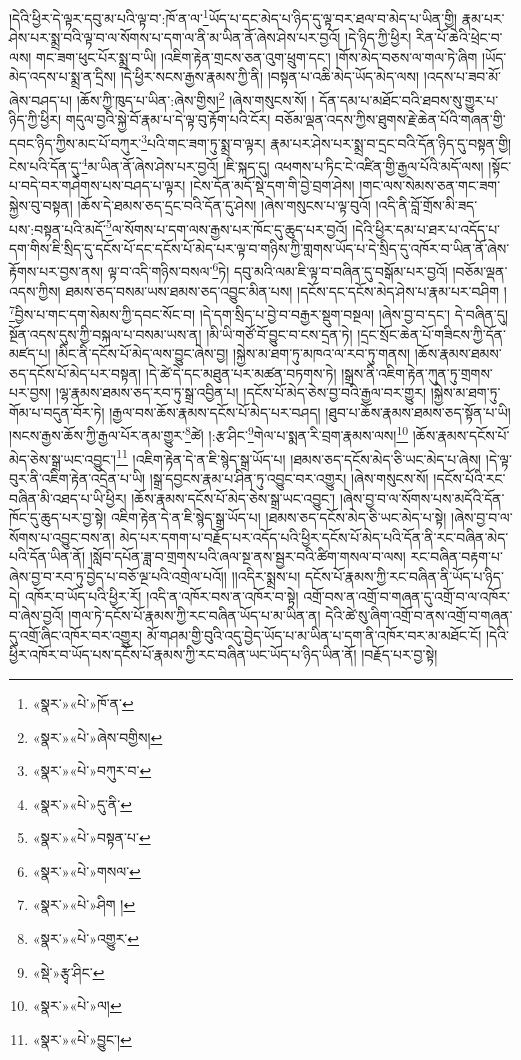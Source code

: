 །དེའི་ཕྱིར་དེ་ལྟར་དབུ་མ་པའི་ལྟ་བ་:ཁོ་ན་ལ་\footnote{«སྣར་»«པེ་»ཁོ་ན་}ཡོད་པ་དང་མེད་པ་ཉིད་དུ་ལྟ་བར་ཐལ་བ་མེད་པ་ཡིན་གྱི། རྣམ་པར་ཤེས་པར་སྨྲ་བའི་ལྟ་བ་ལ་སོགས་པ་དག་ལ་ནི་མ་ཡིན་ནོ་ཞེས་ཤེས་པར་བྱའོ། །དེ་ཉིད་ཀྱི་ཕྱིར། རིན་པོ་ཆེའི་ཕྲེང་བ་ལས། གང་ཟག་ཕུང་པོར་སྨྲ་བ་ཡི། །འཇིག་རྟེན་གྲངས་ཅན་འུག་ཕྲུག་དང་། །གོས་མེད་བཅས་ལ་གལ་ཏེ་ཞིག །ཡོད་མེད་འདས་པ་སྨྲ་ན་དྲིས། །དེ་ཕྱིར་སངས་རྒྱས་རྣམས་ཀྱི་ནི། །བསྟན་པ་འཆི་མེད་ཡོད་མེད་ལས། །འདས་པ་ཟབ་མོ་ཞེས་བཤད་པ། །ཆོས་ཀྱི་ཁུད་པ་ཡིན་:ཞེས་གྱིས།\footnote{«སྣར་»«པེ་»ཞེས་བགྱིས།} །ཞེས་གསུངས་སོ། །
དོན་དམ་པ་མཐོང་བའི་ཐབས་སུ་གྱུར་པ་ཉིད་ཀྱི་ཕྱིར། གདུལ་བྱའི་སྐྱེ་བོ་རྣམ་པ་དེ་ལྟ་བུ་རྟོག་པའི་ངོར། བཅོམ་ལྡན་འདས་ཀྱིས་ཐུགས་རྗེ་ཆེན་པོའི་གཞན་གྱི་དབང་ཉིད་ཀྱིས་མང་པོ་བཀུར་\footnote{«སྣར་»«པེ་»བཀུར་བ་}པའི་གང་ཟག་ཏུ་སྨྲ་བ་ལྟར། རྣམ་པར་ཤེས་པར་སྨྲ་བ་དྲང་བའི་དོན་ཉིད་དུ་བསྟན་གྱི། ངེས་པའི་དོན་དུ་\footnote{«སྣར་»«པེ་»དུ་ནི་}མ་ཡིན་ནོ་ཞེས་ཤེས་པར་བྱའོ། །ཇི་སྐད་དུ། འཕགས་པ་ཏིང་ངེ་འཛིན་གྱི་རྒྱལ་པོའི་མདོ་ལས། །སྟོང་པ་བདེ་བར་གཤེགས་པས་བཤད་པ་ལྟར། །ངེས་དོན་མདོ་སྡེ་དག་གི་བྱེ་བྲག་ཤེས། །གང་ལས་སེམས་ཅན་གང་ཟག་སྐྱེས་བུ་བསྟན། །ཆོས་དེ་ཐམས་ཅད་དྲང་བའི་དོན་དུ་ཤེས། །ཞེས་གསུངས་པ་ལྟ་བུའོ། །འདི་ནི་བློ་གྲོས་མི་ཟད་པས་:བསྟན་པའི་མདོ་\footnote{«སྣར་»«པེ་»བསྟན་པ་}ལ་སོགས་པ་དག་ལས་རྒྱས་པར་ཁོང་དུ་ཆུད་པར་བྱའོ། །དེའི་ཕྱིར་དམ་པ་ཐར་པ་འདོད་པ་དག་གིས་ཇི་སྲིད་དུ་དངོས་པོ་དང་དངོས་པོ་མེད་པར་ལྟ་བ་གཉིས་ཀྱི་གླགས་ཡོད་པ་དེ་སྲིད་དུ་འཁོར་བ་ཡིན་ནོ་ཞེས་རྟོགས་པར་བྱས་ནས། ལྟ་བ་འདི་གཉིས་བསལ་\footnote{«སྣར་»«པེ་»གསལ་}ཏེ། དབུ་མའི་ལམ་ཇི་ལྟ་བ་བཞིན་དུ་བསྒོམ་པར་བྱའོ། །བཅོམ་ལྡན་འདས་ཀྱིས། ཐམས་ཅད་བསམ་ཡས་ཐམས་ཅད་འབྱུང་མིན་པས། །དངོས་དང་དངོས་མེད་ཤེས་པ་རྣམ་པར་བཤིག །\footnote{«སྣར་»«པེ་»ཤིག །}བྱིས་པ་གང་དག་སེམས་ཀྱི་དབང་སོང་བ། །དེ་དག་སྲིད་པ་བྱེ་བ་བརྒྱར་སྡུག་བསྔལ། །ཞེས་བྱ་བ་དང་། དེ་བཞིན་དུ། སྔོན་འདས་དུས་ཀྱི་བསྐལ་པ་བསམ་ཡས་ན། །མི་ཡི་གཙོ་བོ་བྱུང་བ་ངས་དྲན་ཏེ། །དྲང་སྲོང་ཆེན་པོ་གཟིངས་ཀྱི་དོན་མཛད་པ། །མིང་ནི་དངོས་པོ་མེད་ལས་བྱུང་ཞེས་བྱ། །སྐྱེས་མ་ཐག་ཏུ་མཁའ་ལ་རབ་ཏུ་གནས། །ཆོས་རྣམས་ཐམས་ཅད་དངོས་པོ་མེད་པར་བསྟན། །དེ་ཚེ་དེ་དང་མཐུན་པར་མཚན་བཏགས་ཏེ། །སྒྲས་ནི་འཇིག་རྟེན་ཀུན་ཏུ་གྲགས་པར་བྱས། །ལྷ་རྣམས་ཐམས་ཅད་རབ་ཏུ་སྒྲ་འབྱིན་པ། །དངོས་པོ་མེད་ཅེས་བྱ་བའི་རྒྱལ་བར་གྱུར། །སྐྱེས་མ་ཐག་ཏུ་གོམ་པ་བདུན་བོར་ཏེ། །རྒྱལ་བས་ཆོས་རྣམས་དངོས་པོ་མེད་པར་བཤད། །ཐུབ་པ་ཆོས་རྣམས་ཐམས་ཅད་སྟོན་པ་ཡི། །སངས་རྒྱས་ཆོས་ཀྱི་རྒྱལ་པོར་ནམ་གྱུར་\footnote{«སྣར་»«པེ་»འགྱུར་}ཚེ། །:རྩ་ཤིང་\footnote{«སྡེ་»རྩྭ་ཤིང་}གེལ་པ་སྨན་རི་བྲག་རྣམས་ལས།\footnote{«སྣར་»«པེ་»ལ།} །ཆོས་རྣམས་དངོས་པོ་མེད་ཅེས་སྒྲ་ཡང་འབྱུང་།\footnote{«སྣར་»«པེ་»བྱུང་།} །འཇིག་རྟེན་དེ་ན་ཇི་སྙེད་སྒྲ་ཡོད་པ། །ཐམས་ཅད་དངོས་མེད་ཅི་ཡང་མེད་པ་ཞེས། །དེ་ལྟ་བུར་ནི་འཇིག་རྟེན་འདྲེན་པ་ཡི། །སྒྲ་དབྱངས་རྣམ་པ་ཤིན་ཏུ་འབྱུང་བར་འགྱུར། །ཞེས་གསུངས་སོ། །དངོས་པོའི་རང་བཞིན་མི་འཐད་པ་ཡི་ཕྱིར། །ཆོས་རྣམས་དངོས་པོ་མེད་ཅེས་སྒྲ་ཡང་འབྱུང་། །ཞེས་བྱ་བ་ལ་སོགས་པས་མདོའི་དོན་ཁོང་དུ་ཆུད་པར་བྱ་སྟེ། འཇིག་རྟེན་དེ་ན་ཇི་སྙེད་སྒྲ་ཡོད་པ། །ཐམས་ཅད་དངོས་མེད་ཅི་ཡང་མེད་པ་སྟེ། །ཞེས་བྱ་བ་ལ་སོགས་པ་འབྱུང་བས་ན། མེད་པར་དགག་པ་བརྗོད་པར་འདོད་པའི་ཕྱིར་དངོས་པོ་མེད་པའི་དོན་ནི་རང་བཞིན་མེད་པའི་དོན་ཡིན་ནོ། །སློབ་དཔོན་ཟླ་བ་གྲགས་པའི་ཞལ་སྔ་ནས་སྦྱར་བའི་ཚིག་གསལ་བ་ལས། རང་བཞིན་བརྟག་པ་ཞེས་བྱ་བ་རབ་ཏུ་བྱེད་པ་བཅོ་ལྔ་པའི་འགྲེལ་པའོ།། །།འདིར་སྨྲས་པ། དངོས་པོ་རྣམས་ཀྱི་རང་བཞིན་ནི་ཡོད་པ་ཉིད་དེ། འཁོར་བ་ཡོད་པའི་ཕྱིར་རོ། །འདི་ན་འཁོར་བས་ན་འཁོར་བ་སྟེ། འགྲོ་བས་ན་འགྲོ་བ་གཞན་དུ་འགྲོ་བ་ལ་འཁོར་བ་ཞེས་བྱའོ། །གལ་ཏེ་དངོས་པོ་རྣམས་ཀྱི་རང་བཞིན་ཡོད་པ་མ་ཡིན་ན། དེའི་ཚེ་སུ་ཞིག་འགྲོ་བ་ནས་འགྲོ་བ་གཞན་དུ་འགྲོ་ཞིང་འཁོར་བར་འགྱུར། མོ་གཤམ་གྱི་བུའི་འདུ་བྱེད་ཡོད་པ་མ་ཡིན་པ་དག་ནི་འཁོར་བར་མ་མཐོང་ངོ། །དེའི་ཕྱིར་འཁོར་བ་ཡོད་པས་དངོས་པོ་རྣམས་ཀྱི་རང་བཞིན་ཡང་ཡོད་པ་ཉིད་ཡིན་ནོ། །བརྗོད་པར་བྱ་སྟེ། 